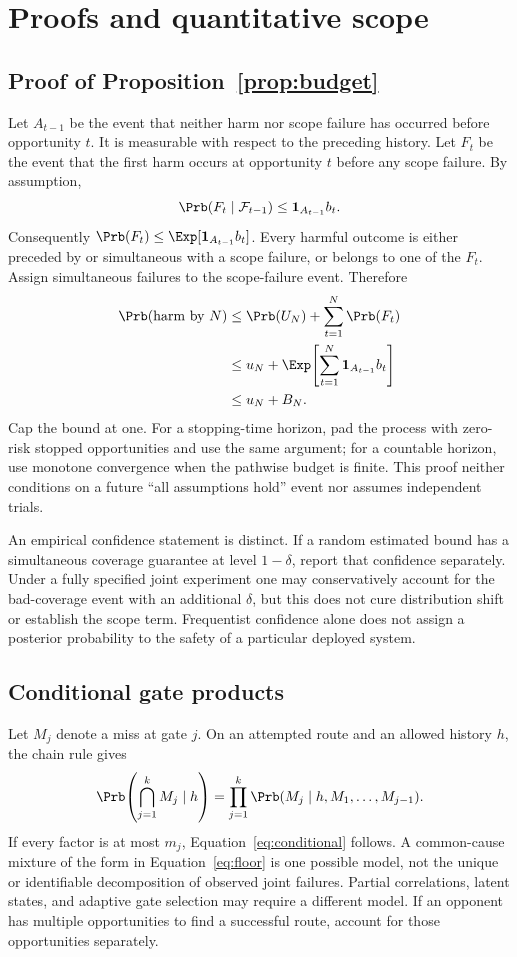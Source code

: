 \section{Proofs and quantitative scope}
\label{app:proofs}

\subsection{Proof of Proposition~\ref{prop:budget}}
Let $A_{t-1}$ be the event that neither harm nor scope failure has occurred before opportunity $t$. It is measurable with respect to the preceding history. Let $F_t$ be the event that the first harm occurs at opportunity $t$ before any scope failure. By assumption,
\[
\Prb(F_t\mid\mathcal F_{t-1})\le\mathbf1_{A_{t-1}}b_t.
\]
Consequently $\Prb(F_t)\le\Exp[\mathbf1_{A_{t-1}}b_t]$. Every harmful outcome is either preceded by or simultaneous with a scope failure, or belongs to one of the $F_t$. Assign simultaneous failures to the scope-failure event. Therefore
\begin{align*}
\Prb(\text{harm by }N)
&\le \Prb(U_N)+\sum_{t=1}^{N}\Prb(F_t)\\
&\le u_N+\Exp\!\left[\sum_{t=1}^{N}\mathbf1_{A_{t-1}}b_t\right]\\
&\le u_N+B_N.
\end{align*}
Cap the bound at one. For a stopping-time horizon, pad the process with zero-risk stopped opportunities and use the same argument; for a countable horizon, use monotone convergence when the pathwise budget is finite. This proof neither conditions on a future ``all assumptions hold'' event nor assumes independent trials.

An empirical confidence statement is distinct. If a random estimated bound has a simultaneous coverage guarantee at level $1-\delta$, report that confidence separately. Under a fully specified joint experiment one may conservatively account for the bad-coverage event with an additional $\delta$, but this does not cure distribution shift or establish the scope term. Frequentist confidence alone does not assign a posterior probability to the safety of a particular deployed system.

\subsection{Conditional gate products}
Let $M_j$ denote a miss at gate $j$. On an attempted route and an allowed history $h$, the chain rule gives
\[
\Prb\!\left(\bigcap_{j=1}^k M_j\mid h\right)
=\prod_{j=1}^k\Prb(M_j\mid h,M_1,\ldots,M_{j-1}).
\]
If every factor is at most $m_j$, Equation~\eqref{eq:conditional} follows. A common-cause mixture of the form in Equation~\eqref{eq:floor} is one possible model, not the unique or identifiable decomposition of observed joint failures. Partial correlations, latent states, and adaptive gate selection may require a different model. If an opponent has multiple opportunities to find a successful route, account for those opportunities separately.

